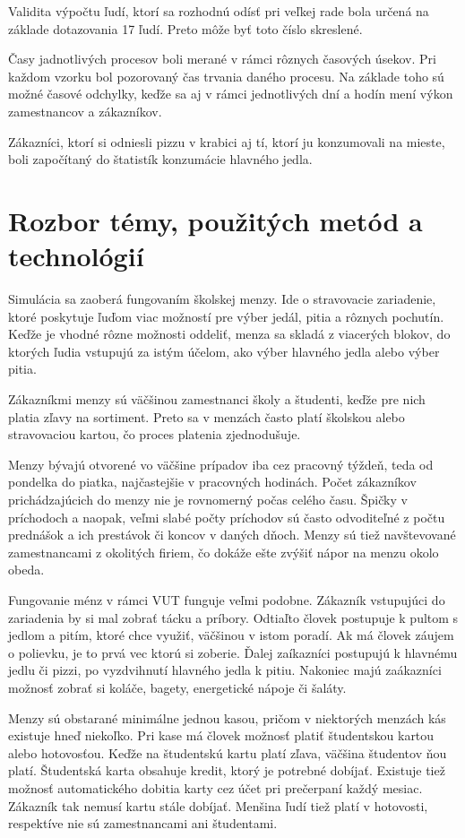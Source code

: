 \documentclass{article}
\begin{document}
Validita výpočtu ľudí, ktorí sa rozhodnú odísť pri veľkej rade bola určená na základe dotazovania 17 ľudí. Preto môže byť toto číslo skreslené.

Časy jadnotlivých procesov boli merané v rámci rôznych časových úsekov. Pri každom vzorku bol pozorovaný čas trvania daného procesu. Na základe toho sú možné časové odchylky, keďže sa aj v rámci jednotlivých dní a hodín mení výkon zamestnancov a zákazníkov.

Zákazníci, ktorí si odniesli pizzu v krabici aj tí, ktorí ju konzumovali na mieste, boli započítaný do štatistík konzumácie hlavného jedla.

\section{Rozbor témy, použitých metód a technológií}
Simulácia sa zaoberá fungovaním školskej menzy. Ide o stravovacie zariadenie, ktoré poskytuje ľuďom viac možností pre výber jedál, pitia a rôznych pochutín. Keďže je vhodné rôzne možnosti oddeliť, menza sa skladá z viacerých blokov, do ktorých ľudia vstupujú za istým účelom, ako výber hlavného jedla alebo výber pitia.

Zákazníkmi menzy sú väčšinou zamestnanci školy a študenti, keďže pre nich platia zľavy na sortiment. Preto sa v menzách často platí školskou alebo stravovaciou kartou, čo proces platenia zjednodušuje.

Menzy bývajú otvorené vo väčšine prípadov iba cez pracovný týždeň, teda od pondelka do piatka, najčastejšie v pracovných hodinách. Počet zákazníkov prichádzajúcich do menzy nie je rovnomerný počas celého času. Špičky v príchodoch a naopak, veľmi slabé počty príchodov sú často odvoditeľné z počtu prednášok a ich prestávok či koncov v daných dňoch. Menzy sú tiež navštevované zamestnancami z okolitých firiem, čo dokáže ešte zvýšiť nápor na menzu okolo obeda.

Fungovanie ménz v rámci VUT funguje veľmi podobne. Zákazník vstupujúci do zariadenia by si mal zobrať tácku a príbory. Odtiaľto človek postupuje k pultom s jedlom a pitím, ktoré chce využiť, väčšinou v istom poradí. Ak má človek záujem o polievku, je to prvá vec ktorú si zoberie. Ďalej zaíkazníci postupujú k hlavnému jedlu či pizzi, po vyzdvihnutí hlavného jedla k pitiu. Nakoniec majú zaákazníci možnosť zobrať si koláče, bagety, energetické nápoje či šaláty.

Menzy sú obstarané minimálne jednou kasou, pričom v niektorých menzách kás existuje hneď niekoľko. Pri kase má človek možnosť platiť študentskou kartou alebo hotovosťou. Keďže na študentskú kartu platí zľava, väčšina študentov ňou platí. Študentská karta obsahuje kredit, ktorý je potrebné dobíjať. Existuje tiež možnosť automatického dobitia karty cez účet pri prečerpaní každý mesiac. Zákazník tak nemusí kartu stále dobíjať. Menšina ľudí tiež platí v hotovosti, respektíve nie sú zamestnancami ani študentami.
\end{document}
